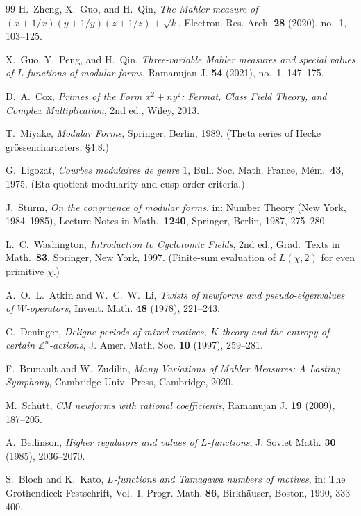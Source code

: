 \documentclass[11pt]{article}
\newcommand{\Zz}{\mathbb{Z}}
\theoremstyle{definition}
\theoremstyle{remark}
\begin{document}
\begin{thebibliography}{99}
H.~Zheng, X.~Guo, and H.~Qin,
\emph{The Mahler measure of $(x+1/x)(y+1/y)(z+1/z)+\sqrt{k}$},
Electron. Res. Arch. \textbf{28} (2020), no.~1, 103--125.

X.~Guo, Y.~Peng, and H.~Qin,
\emph{Three-variable Mahler measures and special values of $L$-functions
of modular forms},
Ramanujan J. \textbf{54} (2021), no.~1, 147--175.

D.~A.~Cox,
\emph{Primes of the Form $x^2+ny^2$: Fermat, Class Field Theory, and
Complex Multiplication}, 2nd ed., Wiley, 2013.

T.~Miyake,
\emph{Modular Forms},
Springer, Berlin, 1989.
(Theta series of Hecke gr\"ossencharacters, \S4.8.)

G.~Ligozat,
\emph{Courbes modulaires de genre $1$},
Bull. Soc. Math. France, M\'em.\ \textbf{43}, 1975.
(Eta-quotient modularity and cusp-order criteria.)

J.~Sturm,
\emph{On the congruence of modular forms},
in: Number Theory (New York, 1984--1985),
Lecture Notes in Math.\ \textbf{1240}, Springer, Berlin, 1987,
275--280.

L.~C.~Washington,
\emph{Introduction to Cyclotomic Fields}, 2nd ed.,
Grad.\ Texts in Math.\ \textbf{83}, Springer, New York, 1997.
(Finite-sum evaluation of $L(\chi,2)$ for even primitive $\chi$.)

A.~O.~L.~Atkin and W.~C.~W.~Li,
\emph{Twists of newforms and pseudo-eigenvalues of $W$-operators},
Invent. Math. \textbf{48} (1978), 221--243.

C.~Deninger,
\emph{Deligne periods of mixed motives, $K$-theory and the entropy of
certain $\Zz^n$-actions},
J. Amer. Math. Soc. \textbf{10} (1997), 259--281.

F.~Brunault and W.~Zudilin,
\emph{Many Variations of Mahler Measures: A Lasting Symphony},
Cambridge Univ. Press, Cambridge, 2020.

M.~Sch\"utt,
\emph{CM newforms with rational coefficients},
Ramanujan J. \textbf{19} (2009), 187--205.

A.~Beilinson,
\emph{Higher regulators and values of $L$-functions},
J. Soviet Math. \textbf{30} (1985), 2036--2070.

S.~Bloch and K.~Kato,
\emph{$L$-functions and Tamagawa numbers of motives},
in: The Grothendieck Festschrift, Vol.~I,
Progr. Math. \textbf{86}, Birkh\"auser, Boston, 1990, 333--400.


\end{thebibliography}
\end{document}
